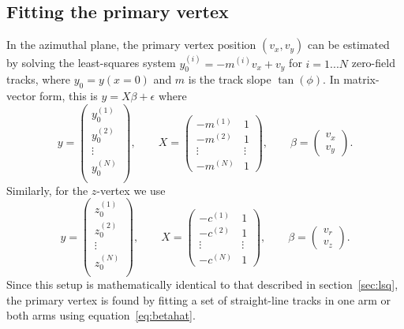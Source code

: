 \documentclass[12pt]{article}
\begin{document}
\subsection{Fitting the primary vertex} \label{sec:vertex}
In the azimuthal plane, the primary vertex position $(v_x, v_y)$ can be estimated by solving the least-squares system $y_0^{(i)} = -m^{(i)}v_x + v_y$ for $i=1...N$ zero-field tracks, where $y_0 = y(x=0)$ and $m$ is the track slope $\tan(\phi)$. In matrix-vector form, this is $y = X\beta + \epsilon$ where
\begin{equation} \label{eq:vxy}
y = 
 \begin{pmatrix}
 y_0^{(1)}\\
 y_0^{(2)}\\
 \vdots \\
 y_0^{(N)}\\
 \end{pmatrix},
 \qquad
X =
 \begin{pmatrix}
  -m^{(1)}  & 1\\
  -m^{(2)}  & 1\\
  \vdots  & \vdots \\
  -m^{(N)}  & 1
 \end{pmatrix},
 \qquad
\beta = 
 \begin{pmatrix}
 v_x\\
 v_y
 \end{pmatrix}.
\end{equation}
Similarly, for the $z$-vertex we use
\begin{equation} \label{eq:vrz}
y = 
 \begin{pmatrix}
 z_0^{(1)}\\
 z_0^{(2)}\\
 \vdots \\
 z_0^{(N)}\\
 \end{pmatrix},
 \qquad
X =
 \begin{pmatrix}
  -c^{(1)}  & 1\\
  -c^{(2)}  & 1\\
  \vdots  & \vdots \\
  -c^{(N)}  & 1
 \end{pmatrix},
 \qquad
\beta = 
 \begin{pmatrix}
 v_r\\
 v_z
 \end{pmatrix}.
\end{equation}
Since this setup is mathematically identical to that described in section~\ref{sec:lsq}, the primary vertex is found by fitting a set of straight-line tracks in one arm or both arms using equation~\ref{eq:betahat}.
\end{document}
